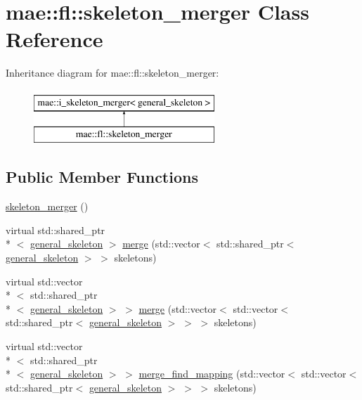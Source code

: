 \hypertarget{classmae_1_1fl_1_1skeleton__merger}{\section{mae\-:\-:fl\-:\-:skeleton\-\_\-merger Class Reference}
\label{classmae_1_1fl_1_1skeleton__merger}
}
Inheritance diagram for mae\-:\-:fl\-:\-:skeleton\-\_\-merger\-:\begin{figure}[H]
\begin{center}
\leavevmode
\includegraphics[height=2.000000cm]{classmae_1_1fl_1_1skeleton__merger}
\end{center}
\end{figure}
\subsection*{Public Member Functions}
\begin{DoxyCompactItemize}
\item 
\hyperlink{classmae_1_1fl_1_1skeleton__merger_a9fd639642fc6c6a40c4e3ee32d67cd3b}{skeleton\-\_\-merger} ()
\item 
virtual std\-::shared\-\_\-ptr\\*
$<$ \hyperlink{classmae_1_1general__skeleton}{general\-\_\-skeleton} $>$ \hyperlink{classmae_1_1fl_1_1skeleton__merger_aecb802bd58e39aa7bd09f71ba784df90}{merge} (std\-::vector$<$ std\-::shared\-\_\-ptr$<$ \hyperlink{classmae_1_1general__skeleton}{general\-\_\-skeleton} $>$ $>$ skeletons)
\item 
virtual std\-::vector\\*
$<$ std\-::shared\-\_\-ptr\\*
$<$ \hyperlink{classmae_1_1general__skeleton}{general\-\_\-skeleton} $>$ $>$ \hyperlink{classmae_1_1fl_1_1skeleton__merger_aefedbb5f4d930ac9b237b1a2e7295992}{merge} (std\-::vector$<$ std\-::vector$<$ std\-::shared\-\_\-ptr$<$ \hyperlink{classmae_1_1general__skeleton}{general\-\_\-skeleton} $>$ $>$ $>$ skeletons)
\item 
virtual std\-::vector\\*
$<$ std\-::shared\-\_\-ptr\\*
$<$ \hyperlink{classmae_1_1general__skeleton}{general\-\_\-skeleton} $>$ $>$ \hyperlink{classmae_1_1fl_1_1skeleton__merger_a4db272fd699c29926d771047a1535bdf}{merge\-\_\-find\-\_\-mapping} (std\-::vector$<$ std\-::vector$<$ std\-::shared\-\_\-ptr$<$ \hyperlink{classmae_1_1general__skeleton}{general\-\_\-skeleton} $>$ $>$ $>$ skeletons)
\end{DoxyCompactItemize}



